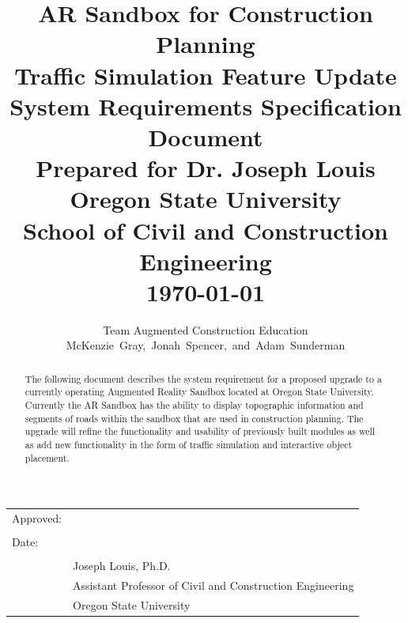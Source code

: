 \documentclass[letterpaper, 10pt, onecolumn, draftclsnofoot]{IEEEtran}
\begin{document}
\title{
    \Large{\textbf{AR Sandbox for Construction Planning \\
                   Traffic Simulation Feature Update}} \\
    \small{System Requirements Specification Document} \\
    \vspace{15pt}
    \large{Prepared for Dr. Joseph Louis \\
    Oregon State University \\
    School of Civil and Construction Engineering \\
    \today}
    }

\author{Team Augmented Construction Education \\
        McKenzie~Gray,~Jonah~Spencer,~and~Adam~Sunderman}
        
\maketitle
\vspace{100pt}
\begin{center}
\begin{tabular}{@{}p{.5in}p{4in}@{}}
Approved: & \hrulefill \\
& \hspace{10em} \\
Date: & \hrulefill \\
& \hspace{10em} \\
& Joseph Louis, Ph.D.\\
& Assistant Professor of Civil and Construction Engineering \\
& Oregon State University \\
\end{tabular}
\end{center}
\vspace{100pt}
\begin{abstract}
    The following document describes the system requirement for a proposed upgrade to a currently operating Augmented Reality Sandbox located at Oregon State University. Currently the AR Sandbox has the ability to display topographic information and segments of roads within the sandbox that are used in construction planning. The upgrade will refine the functionality and usability of previously built modules as well as add new functionality in the form of traffic simulation and interactive object placement.
\end{abstract}
\newpage
\end{document}
